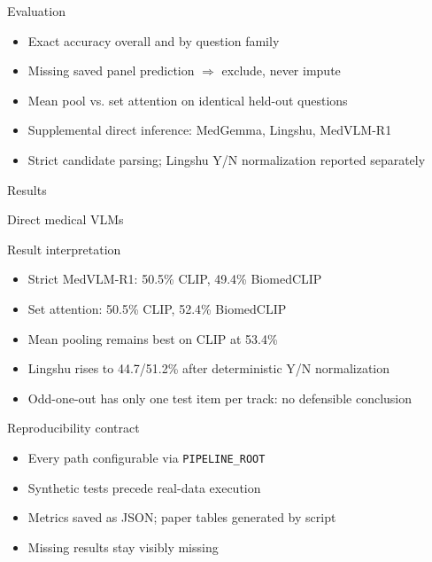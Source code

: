 \documentclass[aspectratio=169]{beamer}
\begin{document}
\begin{frame}{Evaluation}\begin{itemize}\item Exact accuracy overall and by question family\item Missing saved panel prediction $\Rightarrow$ exclude, never impute\item Mean pool vs. set attention on identical held-out questions\item Supplemental direct inference: MedGemma, Lingshu, MedVLM-R1\item Strict candidate parsing; Lingshu Y/N normalization reported separately\end{itemize}\end{frame}
\begin{frame}{Results}\end{frame}
\begin{frame}{Direct medical VLMs}\end{frame}
\begin{frame}{Result interpretation}\begin{itemize}\item Strict MedVLM-R1: 50.5\% CLIP, 49.4\% BiomedCLIP\item Set attention: 50.5\% CLIP, 52.4\% BiomedCLIP\item Mean pooling remains best on CLIP at 53.4\%\item Lingshu rises to 44.7/51.2\% after deterministic Y/N normalization\item Odd-one-out has only one test item per track: no defensible conclusion\end{itemize}\end{frame}
\begin{frame}{Reproducibility contract}\begin{itemize}\item Every path configurable via \texttt{PIPELINE\_ROOT}\item Synthetic tests precede real-data execution\item Metrics saved as JSON; paper tables generated by script\item Missing results stay visibly missing\end{itemize}\end{frame}
\end{document}
